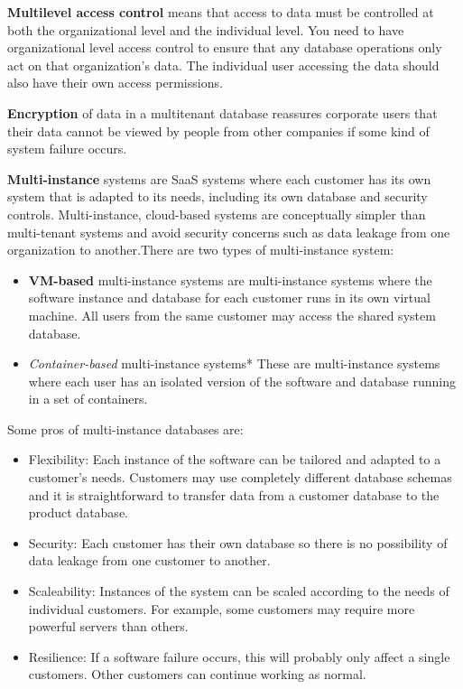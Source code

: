 \documentclass[10pt,a4paper]{report}
\begin{document}
\textbf{Multilevel access control} means that access to data must be controlled at both
the organizational level and the individual level. You need to have organizational level access control to ensure that any
database operations only act on that organization’s data. The individual user
accessing the data should also have their own access permissions.

\textbf{Encryption} of data in a multitenant database reassures corporate users
that their data cannot be viewed by people from other companies if some
kind of system failure occurs.


\textbf{Multi-instance} systems are SaaS systems where each customer has its own
system that is adapted to its needs, including its own database and security
controls. Multi-instance, cloud-based systems are conceptually simpler than multi-tenant
systems and avoid security concerns such as data leakage from one organization
to another.There are two types of multi-instance system:
\begin{itemize}
	\item \textbf{VM-based} multi-instance systems are multi-instance systems where the software
	instance and database for each customer runs in its own virtual machine. All users from
	the same customer may access the shared system database.
	
	\item \textit{Container-based} multi-instance systems* These are multi-instance systems where each
	user has an isolated version of the software and database running in a set of containers.
\end{itemize}

Some pros of multi-instance databases are:
\begin{itemize}
	\item Flexibility:
	Each instance of the software can be tailored and adapted to a customer’s needs.
	Customers may use completely different database schemas and it is
	straightforward to transfer data from a customer database to the product database.
	\item Security:
	Each customer has their own database so there is no possibility of data leakage
	from one customer to another.
	\item Scaleability:
	Instances of the system can be scaled according to the needs of individual
	customers. For example, some customers may require more powerful servers than
	others.
	\item Resilience:
	If a software failure occurs, this will probably only affect a single customers. Other
	customers can continue working as normal.
	
\end{itemize}
\end{document}
